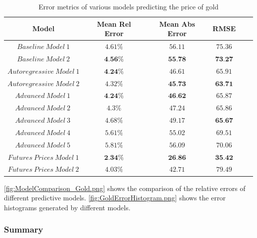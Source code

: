 \documentclass[runningheads]{llncs}
\begin{document}
\begin{table}
\begin{center}
\begin{tabular}{|c|c|c|c|c|c}
\hline
\textbf{Model} & \textbf{Mean Rel Error} & \textbf{Mean Abs Error} & \textbf{RMSE} \\ \hline \hline
$ Baseline\ Model\ 1 $ & $4.61\%$ & $56.11$ & $75.36$  \\ \hline
$ Baseline\ Model\ 2 $ & $\textbf{4.56\%}$ & $\textbf{55.78}$ & $\textbf{73.27}$ \\ \hline \hline

$ Autoregressive\ Model\ 1 $  & $\textbf{4.24\%}$ & $46.61$ & $65.91$ \\ \hline
$ Autoregressive\ Model\ 2 $ & $4.32\%$ & $\textbf{45.73}$ & $\textbf{63.71}$ \\ \hline \hline

$ Advanced\ Model\ 1\ $ & $\textbf{4.24}\%$ & $\textbf{46.62}$ & $65.87$ \\ \hline
$ Advanced\ Model\ 2\ $ & $4.3\%$ & $47.24$ & $65.86$ \\ \hline
$ Advanced\ Model\ 3\ $ & $4.68\%$ & $49.17$ & $\textbf{65.67}$ \\ \hline
$ Advanced\ Model\ 4\ $ & $5.61\%$ & $55.02$ & $69.51$ \\ \hline
$ Advanced\ Model\ 5\ $ & $5.81\%$ & $56.09$ & $70.06$ \\ \hline \hline

$ Futures\ Prices\ Model\ 1 $ & $\textbf{2.34}\%$ & $\textbf{26.86}$ & $\textbf{35.42}$ \\ \hline
$ Futures\ Prices\ Model\ 2 $ & $4.03\%$ & $42.71$ & $79.49$ \\ \hline
\end{tabular}
\end{center} 

\caption{Error metrics of various models predicting the price of gold}
\end{table} 

\autoref{fig:ModelComparison_Gold.png} shows the comparison of the relative errors of different predictive models. \autoref{fig:GoldErrorHistogram.png} shows the error histograms generated by different models.

\subsubsection{Summary}
\end{document}
